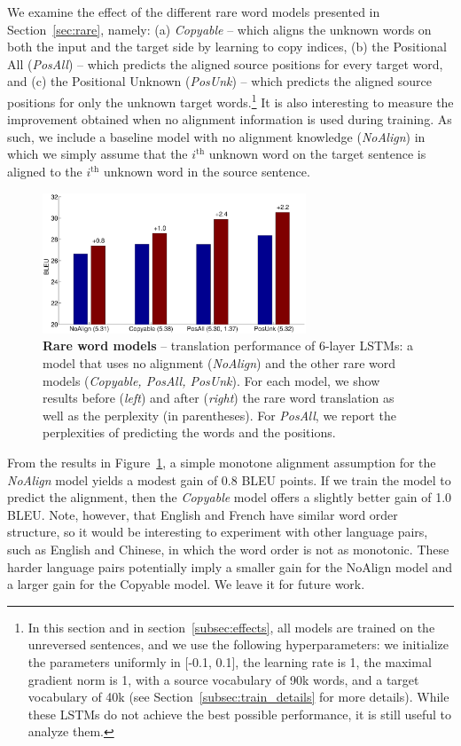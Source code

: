 We examine the effect of the different rare word models presented in
Section~\ref{sec:rare}, namely: (a) {\it Copyable} -- which aligns the unknown
words on both the input and the target side by learning to copy indices, (b) the Positional All
({\it PosAll}) -- which predicts the aligned source positions for every target
word, and (c) the Positional Unknown ({\it PosUnk}) -- which predicts the aligned
source positions for only the unknown target words.\footnote{In this section and in section~\ref{subsec:effects},
all models are trained on the unreversed sentences, and we use the following hyperparameters: 
we initialize the parameters uniformly in [-0.1, 0.1], the learning rate is 1, the maximal gradient norm is 1, 
with a source vocabulary of 90k words, and a target vocabulary of 40k (see Section~\ref{subsec:train_details} for more details).
While these LSTMs do not achieve the best possible performance, it is still useful to analyze them.}
It is also interesting to measure the improvement obtained when no alignment information is used during training.
As such, we include a baseline model with no alignment knowledge ({\it NoAlign}) in which we simply assume that the $i^{\textrm{th}}$ unknown word on the target
sentence is aligned to the $i^{\textrm{th}}$ unknown word in the source sentence.

\begin{figure}
\centering
\includegraphics[width=0.7\textwidth, clip=true, trim= 105 0 140 0]{img/3-compare} %
\caption[Rare word models]{{\bf Rare word models} -- 
translation performance of 6-layer LSTMs:
a model that uses no alignment ({\it NoAlign}) 
and the other rare word models ({\it Copyable, PosAll, PosUnk}). 
For each model, we show results before ({\it left}) and after ({\it right}) the rare word translation as well as the perplexity (in parentheses).
For {\it PosAll}, we report the perplexities of predicting the words and the positions.} 
\label{f:compare}
\end{figure}

 
From the results in Figure~\ref{f:compare}, a simple monotone
alignment assumption for the {\it NoAlign} model yields a modest gain of
0.8 BLEU points. If we train the model to predict the alignment, then the {\it Copyable} model
offers a slightly better gain of 1.0 BLEU. Note, however, that English
and French have similar word order structure, so it would be
interesting to experiment with other language pairs, such as English and
Chinese, in which the word order is not as monotonic. These harder language pairs 
potentially imply a smaller gain for the NoAlign model and a larger
gain for the Copyable model. 
We leave it for future work.

